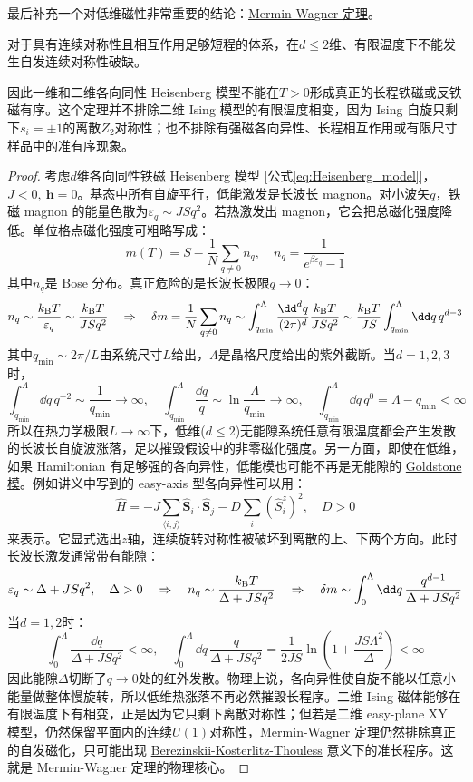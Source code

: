 最后补充一个对低维磁性非常重要的结论：\href{https://en.wikipedia.org/wiki/Mermin%E2%80%93Wagner_theorem}{Mermin-Wagner 定理}。
\begin{theorem}
对于具有连续对称性且相互作用足够短程的体系，在$d\leq2$维、有限温度下不能发生自发连续对称性破缺。
\end{theorem}
\begin{remark} \quad
因此一维和二维各向同性 Heisenberg 模型不能在$T>0$形成真正的长程铁磁或反铁磁有序。这个定理并不排除二维 Ising 模型的有限温度相变，因为 Ising 自旋只剩下$s_i=\pm1$的离散$Z_2$对称性；也不排除有强磁各向异性、长程相互作用或有限尺寸样品中的准有序现象。
\end{remark}
\begin{proof}
考虑$d$维各向同性铁磁 Heisenberg 模型 [公式\ref{eq:Heisenberg_model}]，$J<0, \ \mathbf{h}=0$。基态中所有自旋平行，低能激发是长波长 magnon。对小波矢$q$，铁磁 magnon 的能量色散为$\varepsilon_q\sim JSq^2$。若热激发出 magnon，它会把总磁化强度降低。单位格点磁化强度可粗略写成：
\[m(T)=S-\frac{1}{N}\sum_{q\neq0}n_q,\quad n_q=\frac{1}{e^{\beta\varepsilon_q}-1}\]
其中$n_q$是 Bose 分布。真正危险的是长波长极限$q\to0$：
\[n_q\sim\frac{k_{\rm B}T}{\varepsilon_q}\sim\frac{k_{\rm B}T}{JSq^2} \quad \Rightarrow \quad \delta m=\frac{1}{N}\sum_{q\neq0}n_q\sim\int_{q_{\min}}^\Lambda\frac{\dd^dq}{(2\pi)^d}\frac{k_{\rm B}T}{JSq^2}\sim\frac{k_{\rm B}T}{JS}\int_{q_{\min}}^\Lambda \dd q\,q^{d-3}\]
其中$q_{\min}\sim 2\pi/L$由系统尺寸$L$给出，$\Lambda$是晶格尺度给出的紫外截断。当$d=1,2,3$时，
\[\int_{q_{\min}}^\Lambda \dd q\,q^{-2}\sim\frac{1}{q_{\min}}\to\infty, \quad \int_{q_{\min}}^\Lambda \frac{\dd q}{q}\sim\ln\frac{\Lambda}{q_{\min}}\to\infty, \quad \int_{q_{\min}}^\Lambda \dd q\,q^{0}=\Lambda-q_{\min}<\infty\]
所以在热力学极限$L\to\infty$下，低维($d\leq2$)无能隙系统任意有限温度都会产生发散的长波长自旋波涨落，足以摧毁假设中的非零磁化强度。另一方面，即使在低维，如果 Hamiltonian 有足够强的各向异性，低能模也可能不再是无能隙的 \href{https://en.wikipedia.org/wiki/Goldstone_boson}{Goldstone 模}。例如讲义中写到的 easy-axis 型各向异性可以用：
\[\hat H=-J\sum_{\langle i,j\rangle}\hat{\mathbf S}_i\cdot\hat{\mathbf S}_j-D\sum_i(\hat S_i^z)^2,\quad D>0\]
来表示。它显式选出$z$轴，连续旋转对称性被破坏到离散的上、下两个方向。此时长波长激发通常带有能隙：
\[\varepsilon_q\sim\Delta+JSq^2,\quad \Delta>0 \quad \Rightarrow \quad n_q\sim\frac{k_{\rm B}T}{\Delta+JSq^2} \quad \Rightarrow \quad \delta m\sim\int_0^\Lambda\dd q\,\frac{q^{d-1}}{\Delta+JSq^2}\]
当$d=1,2$时：
\[\int_0^\Lambda\frac{\dd q}{\Delta+JSq^2}<\infty, \quad \int_0^\Lambda\dd q\,\frac{q}{\Delta+JSq^2}=\frac{1}{2JS}\ln\left(1+\frac{JS\Lambda^2}{\Delta}\right)<\infty\]
因此能隙$\Delta$切断了$q\to0$处的红外发散。物理上说，各向异性使自旋不能以任意小能量做整体慢旋转，所以低维热涨落不再必然摧毁长程序。二维 Ising 磁体能够在有限温度下有相变，正是因为它只剩下离散对称性；但若是二维 easy-plane XY 模型，仍然保留平面内的连续$U(1)$对称性，Mermin-Wagner 定理仍然排除真正的自发磁化，只可能出现 \href{https://en.wikipedia.org/wiki/Berezinskii%E2%80%93Kosterlitz%E2%80%93Thouless_transition}{Berezinskii-Kosterlitz-Thouless} 意义下的准长程序。这就是 Mermin-Wagner 定理的物理核心。
\end{proof}


